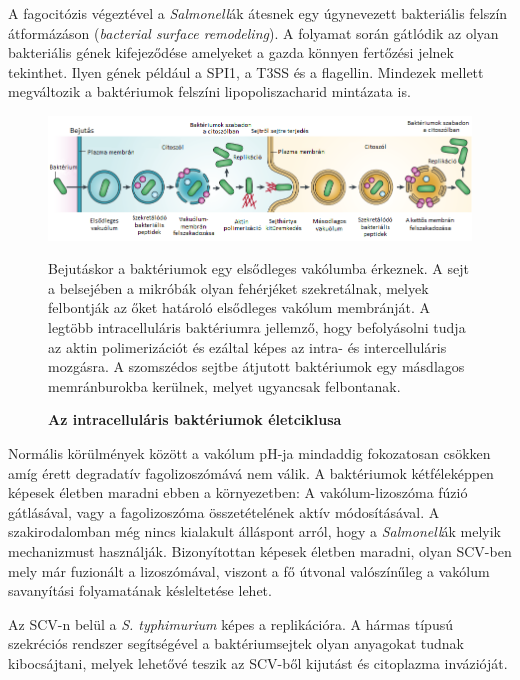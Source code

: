 \documentclass[a4paper,12pt]{article}
\newenvironment{imgdesc}{
		\small
		\singlespacing
		\begin{center}
		
	}{
		\end{center}	
	}
\begin{document}
		A fagocitózis végeztével a \textit{Salmonell}ák átesnek egy úgynevezett bakteriális felszín átformázáson (\textit{bacterial surface remodeling}). A folyamat során gátlódik az olyan bakteriális gének kifejeződése amelyeket a gazda könnyen fertőzési jelnek tekinthet. Ilyen gének például a SPI1, a T3SS és a flagellin. Mindezek mellett megváltozik a baktériumok felszíni lipopoliszacharid mintázata is.  \cite{salmonella_and_host_cell_nature}
		
		 \begin{figure}[H]
			 \centering
			 \includegraphics[scale=0.7]{img/intracell_bakt_terj_am.png}
			 \caption{\textbf{Az intracelluláris baktériumok életciklusa}}
			 \begin{imgdesc}
				 Bejutáskor a baktériumok egy elsődleges vakólumba érkeznek. A sejt a belsejében a mikróbák olyan fehérjéket szekretálnak, melyek felbontják az őket határoló elsődleges vakólum membránját. A legtöbb intracelluláris baktériumra jellemző, hogy befolyásolni tudja az aktin polimerizációt és ezáltal képes az intra- és intercelluláris mozgásra. A szomszédos sejtbe átjutott baktériumok egy másdlagos memránburokba kerülnek, melyet ugyancsak felbontanak.
			 \end{imgdesc}
			 \label{fig:salmo_cycle}
		 \end{figure}
		
		 Normális körülmények között a vakólum pH-ja mindaddig fokozatosan csökken amíg érett degradatív fagolizoszómává nem válik. A baktériumok kétféleképpen képesek életben maradni ebben a környezetben: A vakólum-lizoszóma fúzió gátlásával, vagy a fagolizoszóma összetételének aktív módosításával. \cite{salmonella_autophagy_nature_old} A szakirodalomban még nincs kialakult álláspont arról, hogy a \textit{Salmonell}ák melyik mechanizmust használják. Bizonyítottan képesek életben maradni, olyan SCV-ben mely már fuzionált a lizoszómával, viszont a fő útvonal valószínűleg a vakólum savanyítási folyamatának késleltetése lehet. \cite{salmonella_and_host_cell_nature} 
		 
		 Az SCV-n belül a \textit{S. typhimurium} képes a replikációra. A hármas típusú szekréciós rendszer segítségével a baktériumsejtek olyan anyagokat tudnak kibocsájtani, melyek lehetővé teszik az SCV-ből kijutást és citoplazma invázióját. \cite{salmonella_authopagy_intro}
		 
\end{document}
